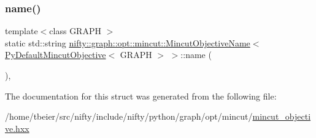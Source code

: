 \subsubsection{\texorpdfstring{name()}{name()}}
{\footnotesize\ttfamily template$<$class G\+R\+A\+PH $>$ \\
static std\+::string \hyperlink{structnifty_1_1graph_1_1opt_1_1mincut_1_1MincutObjectiveName}{nifty\+::graph\+::opt\+::mincut\+::\+Mincut\+Objective\+Name}$<$ \hyperlink{namespacenifty_1_1graph_1_1opt_1_1mincut_a0580af1ea835f50c2c67e3903864ea08}{Py\+Default\+Mincut\+Objective}$<$ G\+R\+A\+PH $>$ $>$\+::name (\begin{DoxyParamCaption}{ }\end{DoxyParamCaption})\hspace{0.3cm}{\ttfamily [inline]}, {\ttfamily [static]}}



The documentation for this struct was generated from the following file\+:\begin{DoxyCompactItemize}
\item 
/home/tbeier/src/nifty/include/nifty/python/graph/opt/mincut/\hyperlink{python_2graph_2opt_2mincut_2mincut__objective_8hxx}{mincut\+\_\+objective.\+hxx}\end{DoxyCompactItemize}
